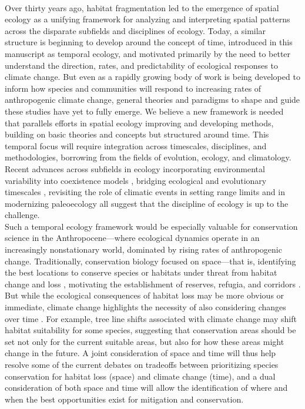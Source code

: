 \documentclass[11pt,a4paper,oneside]{article}
\begin{document}
\\

Over thirty years ago, habitat fragmentation led to the emergence of spatial ecology as a unifying framework for analyzing and interpreting spatial patterns across the disparate subfields and disciplines of ecology. Today, a similar structure is beginning to develop around the concept of time, introduced in this manuscript as temporal ecology, and motivated primarily by the need to better understand the direction, rates, and predictability of ecological responses to climate change. But even as a rapidly growing body of work is being developed to inform how species and communities will respond to increasing rates of anthropogenic climate change, general theories and paradigms to shape and guide these studies have yet to fully emerge. We believe a new framework is needed that parallels efforts in spatial ecology improving and developing methods, building on basic theories and concepts but structured around time. This temporal focus will require integration across timescales, disciplines, and methodologies, borrowing from the fields of evolution, ecology, and climatology. Recent advances across subfields in ecology incorporating environmental variability into coexistence models \citep{Chesson:1997dz}, bridging ecological and evolutionary timescales \citep{schoener2011}, revisiting the role of climatic events in setting range limits \citep{Tran2007} and in modernizing paleoecology \citep{Brewer2012} all suggest that the discipline of ecology is up to the challenge.\\ %

Such a temporal ecology framework would be especially valuable for conservation science in the Anthropocene---where ecological dynamics operate in an increasingly nonstationary world, dominated by rising rates of anthropogenic change. Traditionally, conservation biology focused on space---that is, identifying the best locations to conserve species or habitats under threat from habitat change and loss \citep[e.g.,][]{Doak:1989oc,Cincotta:2000gk}, motivating the establishment of reserves, refugia, and corridors \citep[e.g.,][]{Doak:1989oc}. But while the ecological consequences of habitat loss may be more obvious or immediate, climate change highlights the necessity of also considering changes over time \citep[e.g.,][]{Laurance2012}. For example, tree line shifts associated with climate change may shift habitat suitability for some species, suggesting that conservation areas should be set not only for the current suitable areas, but also for how these areas might change in the future. A joint consideration of space and time will thus help resolve some of the current debates on tradeoffs between prioritizing species conservation for habitat loss (space) and climate change (time), and a dual consideration of both space and time will allow the identification of where and when the best opportunities exist for mitigation and conservation.\\
\end{document}
